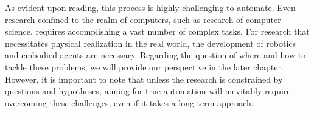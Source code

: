 \documentclass{book}
\begin{document}
As evident upon reading, this process is highly challenging to automate. Even research confined to the realm of computers, such as research of computer science, requires accomplishing a vast number of complex tasks. For research that necessitates physical realization in the real world, the development of robotics and embodied agents are necessary. Regarding the question of where and how to tackle these problems, we will provide our perspective in the later chapter. However, it is important to note that unless the research is constrained by questions and hypotheses, aiming for true automation will inevitably require overcoming these challenges, even if it takes a long-term approach.





\end{document}
